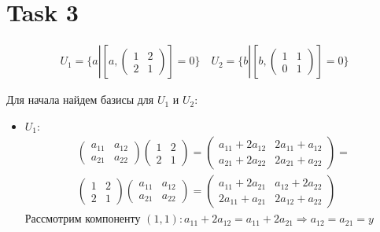 \section{Task 3}
\begin{gather}
    U_1 = \{a| [a,
    \begin{pmatrix}
        1 & 2 \\
        2 & 1    
    \end{pmatrix}] = 0\}\quad 
    U_2 = \{b| [b,
    \begin{pmatrix}
        1 & 1 \\
        0 & 1    
    \end{pmatrix}] = 0\}
\end{gather}

Для начала найдем базисы для $U_1$ и $U_2$:
\begin{itemize}
    \item $U_1$:
    \begin{gather}
        \begin{pmatrix}
            a_{11} & a_{12} \\
            a_{21} & a_{22} 
        \end{pmatrix}
        \begin{pmatrix}
            1 & 2 \\
            2 & 1
        \end{pmatrix} =
        \begin{pmatrix}
            a_{11} + 2a_{12} & 2a_{11} + a_{12} \\
            a_{21} + 2a_{22} & 2a_{21} + a_{22}
        \end{pmatrix} = \\
        \begin{pmatrix}
            1 & 2 \\
            2 & 1
        \end{pmatrix}
        \begin{pmatrix}
            a_{11} & a_{12} \\
            a_{21} & a_{22} 
        \end{pmatrix} = 
        \begin{pmatrix}
            a_{11} + 2a_{21} & a_{12} + 2a_{22} \\
            2a_{11} + a_{21} & 2a_{12} + a_{22}
        \end{pmatrix}
    \end{gather}
    Рассмотрим компоненту $(1,1):a_{11}+2a_{12} = a_{11} + 2a_{21} \Longrightarrow a_{12} = a_{21} = y$
    

\end{itemize}
